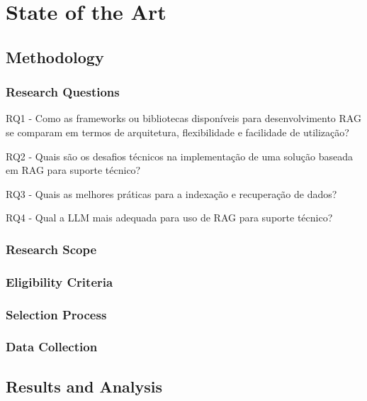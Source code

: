 
\chapter{State of the Art} %
\label{chap:Chapter3} 

\section{Methodology}

\subsection{Research Questions}

RQ1 - Como as frameworks ou bibliotecas disponíveis para desenvolvimento RAG se comparam em termos de arquitetura, flexibilidade e facilidade de utilização?

RQ2 - Quais são os desafios técnicos na implementação de uma solução baseada em RAG para suporte técnico?



RQ3 - Quais as melhores práticas para a indexação e recuperação de dados? 


RQ4 - Qual a LLM mais adequada para uso de RAG para suporte técnico? 




\subsection{Research Scope}

\subsection{Eligibility Criteria}


\subsection{Selection Process}

\subsection{Data Collection}

\section{Results and Analysis}



